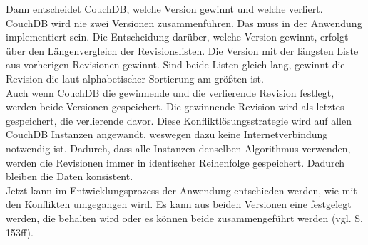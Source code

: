 Dann entscheidet CouchDB, welche Version gewinnt und welche verliert.
CouchDB wird nie zwei Versionen zusammenführen.
Das muss in der Anwendung implementiert sein.
Die Entscheidung darüber, welche Version gewinnt, erfolgt über den Längenvergleich der Revisionslisten.
Die Version mit der längsten Liste aus vorherigen Revisionen gewinnt. Sind beide Listen gleich lang, gewinnt die Revision die laut alphabetischer Sortierung am größten ist.\\
Auch wenn CouchDB die gewinnende und die verlierende Revision festlegt, werden beide Versionen gespeichert.
Die gewinnende Revision wird als letztes gespeichert, die verlierende davor. Diese Konfliktlösungsstrategie wird auf allen CouchDB Instanzen angewandt, weswegen dazu keine Internetverbindung notwendig ist.
Dadurch, dass alle Instanzen denselben Algorithmus verwenden, werden die Revisionen immer in identischer Reihenfolge gespeichert.
Dadurch bleiben die Daten konsistent.\\
Jetzt kann im Entwicklungsprozess der Anwendung entschieden werden, wie mit den Konflikten umgegangen wird.
Es kann aus beiden Versionen eine festgelegt werden, die behalten wird oder es können beide zusammengeführt werden (vgl. \cite{couchDB} S. 153ff).
%
% 
%
%
